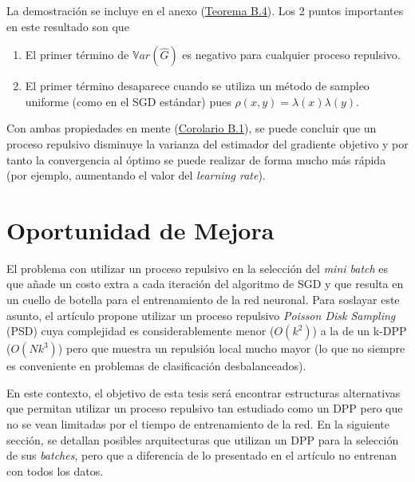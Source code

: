 La demostración se incluye en el anexo (\hyperlink{Teorema B.4}{Teorema B.4}). Los 2 puntos importantes en este resultado son que 
\begin{enumerate}
    \item El primer término de $\mathbb{V}ar(\hat{G})$ es negativo para cualquier proceso repulsivo.
    \item El primer término desaparece cuando se utiliza un método de sampleo uniforme (como en el SGD estándar) pues $\rho(x,y) = \lambda(x)\lambda(y)$. 
\end{enumerate}

Con ambas propiedades en mente (\hyperlink{Corolario B.1}{Corolario B.1}), se puede concluir que un proceso repulsivo disminuye la varianza del estimador del gradiente objetivo y por tanto la convergencia al óptimo se puede realizar de forma mucho más rápida (por ejemplo, aumentando el valor del \textit{learning rate}).

\section{Oportunidad de Mejora}

El problema con utilizar un proceso repulsivo en la selección del \textit{mini batch} es que añade un costo extra a cada iteración del algoritmo de SGD y que resulta en un cuello de botella para el entrenamiento de la red neuronal. Para soslayar este asunto, el artículo \cite{https://doi.org/10.48550/arxiv.1804.02772} propone utilizar un proceso repulsivo \textit{Poisson Disk Sampling} (PSD) cuya complejidad es considerablemente menor ($O(k^2)$) a la de un k-DPP ($O(Nk^3)$) pero que muestra un repulsión local mucho mayor \cite{Biscio_2016} (lo que no siempre es conveniente en problemas de clasificación desbalanceados). 


\vspace{0.2cm}

En este contexto, el objetivo de esta tesis será encontrar estructuras alternativas que permitan utilizar un proceso repulsivo tan estudiado como un DPP pero que no se vean limitadas por el tiempo de entrenamiento de la red. En la siguiente sección, se detallan posibles arquitecturas que utilizan un DPP para la selección de sus \textit{batches}, pero que a diferencia de lo presentado en el artículo \cite{https://doi.org/10.48550/arxiv.1804.02772} no entrenan con todos los datos. 





